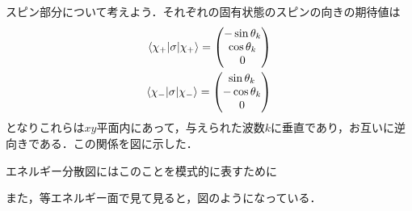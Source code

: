 \documentclass[a4j]{jarticle}
\begin{document}
スピン部分について考えよう．それぞれの固有状態のスピンの向きの期待値は
\begin{align*}
 \braket{\chi_+| \sigma |\chi_+} =
 \begin{pmatrix}
  -\sin\theta_k \\
  \cos\theta_k \\
  0
 \end{pmatrix} \\
 \braket{\chi_-|\sigma |\chi_-} =
  \begin{pmatrix}
   \sin\theta_k \\
   -\cos\theta_k \\
  0
  \end{pmatrix} \\
\end{align*}
となりこれらは$xy$平面内にあって，与えられた波数$k$に垂直であり，お互いに逆向きである．この関係を図に示した．

エネルギー分散図にはこのことを模式的に表すために


また，等エネルギー面で見て見ると，図のようになっている．
\end{document}
